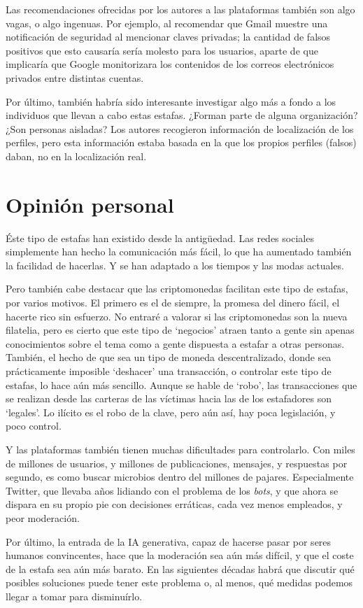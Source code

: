 \documentclass[es]{uc3mreport}
\begin{document}
\begin{report}
        Las recomendaciones ofrecidas por los autores a las plataformas también son algo vagas, o algo ingenuas. Por ejemplo, al recomendar que Gmail muestre una notificación de seguridad al mencionar claves privadas; la cantidad de falsos positivos que esto causaría sería molesto para los usuarios, aparte de que implicaría que Google monitorizara los contenidos de los correos electrónicos privados entre distintas cuentas.

        Por último, también habría sido interesante investigar algo más a fondo a los individuos que llevan a cabo estas estafas. ¿Forman parte de alguna organización? ¿Son personas aisladas? Los autores recogieron información de localización de los perfiles, pero esta información estaba basada en la que los propios perfiles (falsos) daban, no en la localización real.


        \section{Opinión personal}
        Éste tipo de estafas han existido desde la antigüedad. Las redes sociales simplemente han hecho la comunicación más fácil, lo que ha aumentado también la facilidad de hacerlas. Y se han adaptado a los tiempos y las modas actuales.

        Pero también cabe destacar que las criptomonedas facilitan este tipo de estafas, por varios motivos. El primero es el de siempre, la promesa del dinero fácil, el hacerte rico sin esfuerzo. No entraré a valorar si las criptomonedas son la nueva filatelia, pero es cierto que este tipo de `negocios' atraen tanto a gente sin apenas conocimientos sobre el tema como a gente dispuesta a estafar a otras personas. También, el hecho de que sea un tipo de moneda descentralizado, donde sea prácticamente imposible `deshacer' una transacción, o controlar este tipo de estafas, lo hace aún más sencillo. Aunque se hable de `robo', las transacciones que se realizan desde las carteras de las víctimas hacia las de los estafadores son `legales'. Lo ilícito es el robo de la clave, pero aún así, hay poca legislación, y poco control.

        Y las plataformas también tienen muchas dificultades para controlarlo. Con miles de millones de usuarios, y millones de publicaciones, mensajes, y respuestas por segundo, es como buscar microbios dentro del millones de pajares. Especialmente Twitter, que llevaba años lidiando con el problema de los \textit{bots}, y que ahora se dispara en su propio pie con decisiones erráticas, cada vez menos empleados, y peor moderación.

        Por último, la entrada de la IA generativa, capaz de hacerse pasar por seres humanos convincentes, hace que la moderación sea aún más difícil, y que el coste de la estafa sea aún más barato. En las siguientes décadas habrá que discutir qué posibles soluciones puede tener este problema o, al menos, qué medidas podemos llegar a tomar para disminuírlo.

    \end{report}
\end{document}
